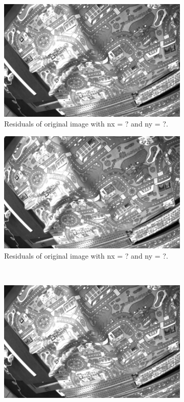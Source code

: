 \begin{figure}[h]
  \centering
  \begin{subfigure}[b]{0.49\textwidth}
    \includegraphics[width=\textwidth]{figures/rect_ru.jpg} 
    \caption{Residuals of original image with nx = ? and ny = ?.}
    \label{fig:rect_ru}
  \end{subfigure}
  \begin{subfigure}[b]{0.49\textwidth}
    \includegraphics[width=\textwidth]{figures/rect_rw.jpg} 
    \caption{Residuals of original image with nx = ? and ny = ?.}
    \label{fig:rect_rw}
  \end{subfigure}
  \\
  \begin{subfigure}[b]{0.7\textwidth}
    \includegraphics[width=\textwidth]{figures/rect_rdiff.jpg} 

\end{subfigure}
\end{figure}

